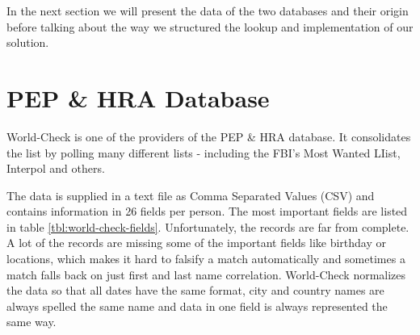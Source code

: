 \documentclass[a4paper, oneside]{csthesis}
\begin{document}
In the next section we will present the data of the two databases and their origin before talking about the way we structured the lookup and implementation of our solution.












\section{PEP \& HRA Database}


World-Check \cite{website:world-check} is one of the providers of the PEP \& HRA database. It consolidates the list by polling many different lists - including the FBI's Most Wanted LIist, Interpol and others.

The data is supplied in a text file as Comma Separated Values (CSV) and contains information in 26 fields per person. The most important fields are listed in table \ref{tbl:world-check-fields}. Unfortunately, the records are far from complete. A lot of the records are missing some of the important fields like birthday or locations, which makes it hard to falsify a match automatically and sometimes a match falls back on just first and last name correlation. World-Check normalizes the data so that all dates have the same format, city and country names are always spelled the same name and data in one field is always represented the same way.
\end{document}
